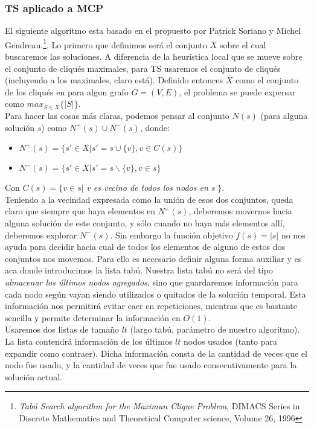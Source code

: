 \subsubsection{TS aplicado a MCP}
El siguiente algorítmo esta basado en el propuesto por Patrick Soriano y Michel Gendreau.\footnote{\textit{Tabú Search algorithm for the Maximun Clique Problem}, DIMACS Series in Discrete Mathematics and Theoretical Computer science, Volume 26, 1996}.
Lo primero que definimos será el conjunto $X$ sobre el cual buscaremos las soluciones. A diferencia de la heurística local que se mueve sobre el conjunto de cliqués maximales, 
para TS usaremos el conjunto de cliqués (incluyendo a los maximales, claro está). Definido entonces $X$ como el conjunto de los cliqués en para algun grafo $G=(V,E)$, el problema 
se puede expersar como ${max}_{S \in X}\{|S|\}$. \\
Para hacer las cosas más claras, podemos pensar al conjunto $N(s)$ (para alguna solución $s$) como $N^{+}(s) \cup N^{-}(s)$, donde:
\begin{itemize}
  \item $N^{+}(s) = \{s' \in X | s'= s \cup \{v\}, v\in C(s) \}$
  \item $N^{-}(s) = \{s' \in X | s'= s \smallsetminus \{v\}, v\in s \}$
\end{itemize}
Con $C(s)=\{v \in s | $ \textit{v es vecino de todos los nodos en s} $\}$.\\
Teniendo a la vecindad expresada como la unión de esos dos conjuntos, queda claro que siempre que haya elementos en $N^{+}(s)$, deberemos movernos hacia alguna solución de este 
conjunto, y sólo cuando no haya más elementos allí, deberemos explorar $N^{-}(s)$. Sin embargo la función objetivo $f(s)=|s|$ no nos ayuda para decidir hacia cual de todos los elementos 
de alguno de estos dos conjuntos nos movemos. Para ello es necesario definir alguna forma auxiliar y es aca donde introducimos la lista tabú. Nuestra lista tabú no será del tipo 
\textit{almacenar los últimos nodos agregados}, sino que guardaremos información para cada nodo según vayan siendo utilizados o quitados de la solución temporal. Esta información 
nos permitirá evitar caer en repeticiones, mientras que es bastante sencilla y permite determinar la información en $O(1)$. \\
Usaremos dos listas de tamaño $lt$ (largo tabú, parámetro de nuestro algoritmo). La lista contendrá información de los últimos $lt$ nodos usados (tanto para expandir como contraer). Dicha información consta de 
la cantidad de veces que el nodo fue usado, y la cantidad de veces que fue usado consecutivamente para la solución actual.\\

